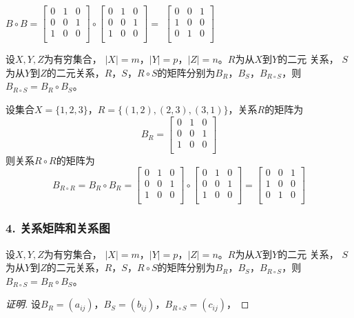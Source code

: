 \documentclass{beamer}
\begin{document}
\begin{CJK*}{UTF8}{gbsn}
\begin{frame}
$B\circ B=\begin{bmatrix}
  0&1&0\\
  0&0&1\\
  1&0&0\\
\end{bmatrix}
\circ
\begin{bmatrix}
  0&1&0\\
  0&0&1\\
  1&0&0\\
\end{bmatrix}
=$
\pause
$\begin{bmatrix}
  0&0&1\\
  1&0&0\\
  0&1&0\\
\end{bmatrix}$
\end{frame}
\begin{frame}
  \begin{Thm4.4}
    设$X, Y, Z$为有穷集合， $|X| =m$，$|Y|=p$，$|Z| = n$。$R$为从$X$到$Y$的二元
    关系， $S$为从$Y$到$Z$的二元关系，$R$，$S$，$R \circ S$的矩阵分别为$B_{R}$，$B_{S}$，$B_{R\circ S}$，则$B_{R\circ S} = B_R \circ B_S$。
  \end{Thm4.4}
  \pause
  设集合$X=\{1,2,3\}$，$R=\{(1,2),(2,3),(3,1)\}$，关系$R$的矩阵为
  \[B_R=\begin{bmatrix}
    0&1&0\\
    0&0&1\\
    1&0&0\\
  \end{bmatrix}
\]
\pause
则关系$R\circ R$的矩阵为
\[B_{R\circ R}=B_R\circ B_R=\begin{bmatrix}
  0&1&0\\
  0&0&1\\
  1&0&0\\
\end{bmatrix}
\circ
\begin{bmatrix}
  0&1&0\\
  0&0&1\\
  1&0&0\\
\end{bmatrix}
=\begin{bmatrix}
  0&0&1\\
  1&0&0\\
  0&1&0\\
\end{bmatrix}
\]
\end{frame}
\begin{frame}
  \frametitle{4. 关系矩阵和关系图}
  \begin{Thm}
    设$X, Y, Z$为有穷集合， $|X| =m$，$|Y|=p$，$|Z| = n$。$R$为从$X$到$Y$的二元
    关系， $S$为从$Y$到$Z$的二元关系，$R$，$S$，$R \circ S$的矩阵分别为$B_{R}$，$B_{S}$，$B_{R\circ S}$，则$B_{R\circ S} = B_R \circ B_S$。
  \end{Thm}
  \pause
  \begin{proof}[证明]
    \pause 设$B_{R}=(a_{ij})$，$B_{S}=(b_{ij})$，$B_{R\circ S}=(c_{ij})$，


\end{proof}
\end{frame}
\end{CJK*}
\end{document}
